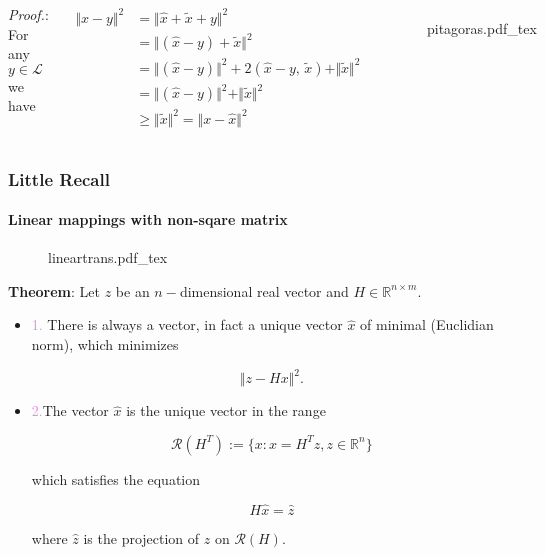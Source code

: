 \documentclass[aspectratio=169]{beamer}
\newcommand{\incfig}[2][1]{%
    \def\svgwidth{#1\columnwidth}
    {#2.pdf_tex} }
\begin{document}
\begin{frame}{} %
	
	\begin{columns}
	
	

{\color{violet} \textit{Proof.}:} For any $y \in \mathcal{L}$ we have

\begin{align*}
	\Vert x-y \Vert^2 &=  \Vert \hat{x} + \tilde{x} + y \Vert^2\\ 
	&= \Vert (\hat{x}-y) + \tilde{x} \Vert^2 \\
	&= \Vert (\hat{x}-y) \Vert^2  + 2(\hat{x}-y,\, \tilde{x})+ \Vert \tilde{x} \Vert^2\\ 
	&= \Vert (\hat{x}-y) \Vert^2 + \Vert \tilde{x} \Vert^2 \\
	& \geq \Vert \tilde{x} \Vert^2 = \Vert x -\hat{x} \Vert^2
\end{align*}
		
		
\begin{figure}[ht]
    \centering
    \incfig{pitagoras}
    \label{fig:pitagoras}
\end{figure}

\end{columns}

\end{frame}

\begin{frame} %
	\frametitle{Little Recall}
	\framesubtitle{Linear mappings with non-sqare matrix}
	
\begin{figure}[ht]
    \centering
    \incfig{lineartrans}
    \label{fig:lineartrans}
\end{figure}

\end{frame}

\begin{frame}{} %
	
{\color{violet} \textbf{Theorem}:} Let $z$ be an $n-$dimensional real vector and $H \in \mathbb{R}^{n \times m}$.\\
	
\begin{itemize}
	\item \textcolor{violet}{1.} There is always a vector, in fact a unique vector $\hat{x}$ of minimal (Euclidian norm), which minimizes

	\[ \Vert z - H x \Vert^2. \]
	
	\item \textcolor{violet}{2.}The vector $\hat{x}$ is the unique vector in the range
		
	\[ \mathcal{R}(H^T) := \{ x : x = H^T z, z\in \mathbb{R}^n  \} \]
	
	\noindent which satisfies the equation
	
	\[ H \hat{x} = \hat{z} \]
	
	\noindent where $\hat{z}$ is the projection of $z$ on $\mathcal{R}(H).$

	\end{itemize}
\end{frame}
\end{document}
